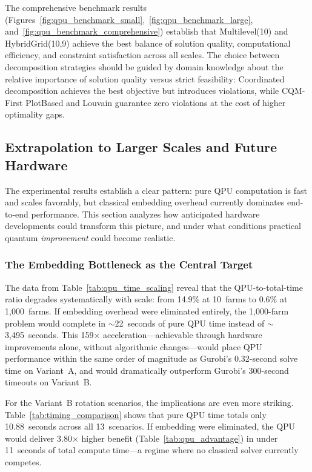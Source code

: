 The comprehensive benchmark results (Figures~\ref{fig:qpu_benchmark_small},~\ref{fig:qpu_benchmark_large}, and~\ref{fig:qpu_benchmark_comprehensive}) establish that Multilevel(10) and HybridGrid(10,9) achieve the best balance of solution quality, computational efficiency, and constraint satisfaction across all scales. The choice between decomposition strategies should be guided by domain knowledge about the relative importance of solution quality versus strict feasibility: Coordinated decomposition achieves the best objective but introduces violations, while CQM-First PlotBased and Louvain guarantee zero violations at the cost of higher optimality gaps.

\subsection{Extrapolation to Larger Scales and Future Hardware}
\label{subsec:future_hardware}

The experimental results establish a clear pattern: pure QPU computation is fast and scales favorably, but classical embedding overhead currently dominates end-to-end performance. This section analyzes how anticipated hardware developments could transform this picture, and under what conditions practical quantum \textit{improvement} could become realistic.

\subsubsection{The Embedding Bottleneck as the Central Target}

The data from Table~\ref{tab:qpu_time_scaling} reveal that the QPU-to-total-time ratio degrades systematically with scale: from 14.9\% at 10~farms to 0.6\% at 1,000~farms. If embedding overhead were eliminated entirely, the 1,000-farm problem would complete in $\sim$22~seconds of pure QPU time instead of $\sim$3,495~seconds. This 159$\times$ acceleration---achievable through hardware improvements alone, without algorithmic changes---would place QPU performance within the same order of magnitude as Gurobi's 0.32-second solve time on Variant~A, and would dramatically outperform Gurobi's 300-second timeouts on Variant~B.

For the Variant~B rotation scenarios, the implications are even more striking. Table~\ref{tab:timing_comparison} shows that pure QPU time totals only 10.88~seconds across all 13~scenarios. If embedding were eliminated, the QPU would deliver 3.80$\times$ higher benefit (Table~\ref{tab:qpu_advantage}) in under 11~seconds of total compute time---a regime where no classical solver currently competes.

